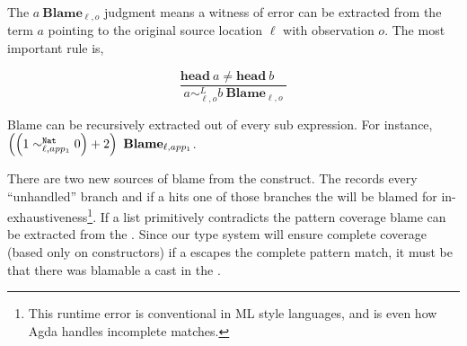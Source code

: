 The $a\ \mathbf{Blame}_{\ell,o}$ judgment means a witness of error can be extracted from the term $a$ pointing to the original source location $\ell$ with observation $o$.
The most important rule is,

\[
\frac{\mathbf{head}\ a\neq\mathbf{head}\ b\quad}{a\sim_{\ell,o}^{L}b\ \mathbf{Blame}_{\ell,o}}
\]

Blame can be recursively extracted out of every sub expression.
For instance, $\left(\left(1\sim_{\ell,app_{1}}^{\mathtt{Nat}{} }0\right)+2\right)\ \mathbf{Blame}_{\ell,app_{1}}$.

There are two new sources of blame from the \case{} construct.
The \clang{} records every ``unhandled'' branch and if a \scrut{} hits one of those branches the \case{} will be blamed for in-exhaustiveness\footnote{
  This runtime error is conventional in ML style languages, and is even how Agda handles incomplete matches.
}.
If a \scrut{} list primitively contradicts the pattern coverage blame can be extracted from the \scrut{}. 
Since our type system will ensure complete coverage (based only on constructors) if a \scrut{} escapes the complete pattern match, it must be that there was blamable a cast in the \scrut.






